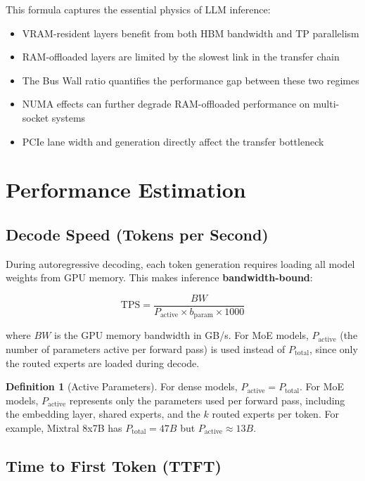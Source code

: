 \documentclass[11pt,a4paper]{article}
\theoremstyle{definition}
\newtheorem{definition}{Definition}[section]
\begin{document}
This formula captures the essential physics of LLM inference:
\begin{itemize}
  \item VRAM-resident layers benefit from both HBM bandwidth and TP parallelism
  \item RAM-offloaded layers are limited by the slowest link in the transfer chain
  \item The Bus Wall ratio quantifies the performance gap between these two regimes
  \item NUMA effects can further degrade RAM-offloaded performance on multi-socket systems
  \item PCIe lane width and generation directly affect the transfer bottleneck
\end{itemize}

\section{Performance Estimation}

\subsection{Decode Speed (Tokens per Second)}

During autoregressive decoding, each token generation requires loading all model weights from GPU memory. This makes inference \textbf{bandwidth-bound}:

\begin{equation}\label{eq:tps}
\text{TPS} = \frac{BW}{P_{\text{active}} \times b_{\text{param}} \times 1000}
\end{equation}

where $BW$ is the GPU memory bandwidth in GB/s. For MoE models, $P_{\text{active}}$ (the number of parameters active per forward pass) is used instead of $P_{\text{total}}$, since only the routed experts are loaded during decode.

\begin{definition}[Active Parameters]
For dense models, $P_{\text{active}} = P_{\text{total}}$. For MoE models, $P_{\text{active}}$ represents only the parameters used per forward pass, including the embedding layer, shared experts, and the $k$ routed experts per token. For example, Mixtral 8x7B has $P_{\text{total}} = 47B$ but $P_{\text{active}} \approx 13B$.
\end{definition}

\subsection{Time to First Token (TTFT)}
\end{document}
